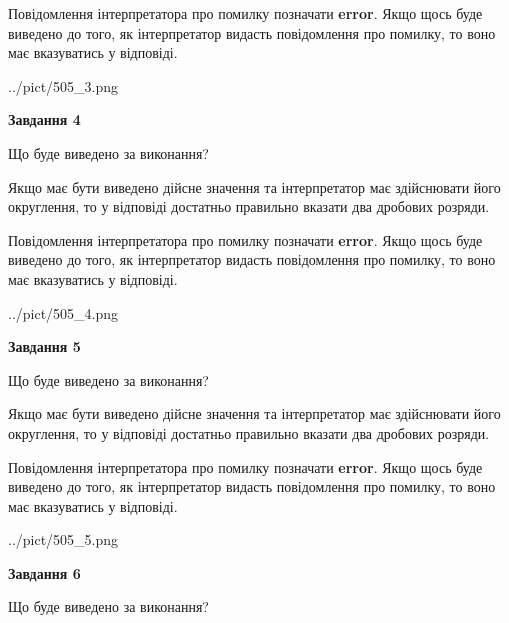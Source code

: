 \documentclass[12pt, ukrainian]{article}
\begin{document}
{\begin {Large}
Повідомлення інтерпретатора про помилку позначати \textbf{error}.
Якщо щось буде виведено до того, як інтерпретатор видасть повідомлення про помилку, 
то воно має вказуватись у відповіді. \par

\begin{center}
	{../pict/505_3.png}
\end{center}
\newpage

{\begin {center}\textbf{Завдання 4}\end {center}}\par
Що буде виведено за виконання? \par

Якщо має бути виведено дійсне значення та інтерпретатор має здійснювати його округлення, 
то у відповіді достатньо правильно вказати два дробових розряди.

Повідомлення інтерпретатора про помилку позначати \textbf{error}.
Якщо щось буде виведено до того, як інтерпретатор видасть повідомлення про помилку, 
то воно має вказуватись у відповіді. \par

\begin{center}
	{../pict/505_4.png}
\end{center}
\newpage

{\begin {center}\textbf{Завдання 5}\end {center}}\par
Що буде виведено за виконання? \par

Якщо має бути виведено дійсне значення та інтерпретатор має здійснювати його округлення, 
то у відповіді достатньо правильно вказати два дробових розряди.

Повідомлення інтерпретатора про помилку позначати \textbf{error}.
Якщо щось буде виведено до того, як інтерпретатор видасть повідомлення про помилку, 
то воно має вказуватись у відповіді. \par

\begin{center}
	{../pict/505_5.png}
\end{center}
\newpage

{\begin {center}\textbf{Завдання 6}\end {center}}\par
Що буде виведено за виконання? \par


\end{Large}}
\end{document}
